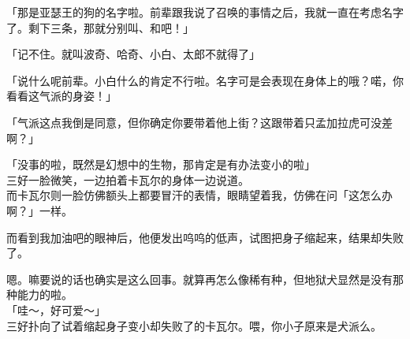 「那是亚瑟王的狗的名字啦。前辈跟我说了召唤的事情之后，我就一直在考虑名字了。剩下三条，那就分别叫、和吧！」

「记不住。就叫波奇、哈奇、小白、太郎不就得了」

「说什么呢前辈。小白什么的肯定不行啦。名字可是会表现在身体上的哦？喏，你看看这气派的身姿！」

「气派这点我倒是同意，但你确定你要带着他上街？这跟带着只孟加拉虎可没差啊？」

「没事的啦，既然是幻想中的生物，那肯定是有办法变小的啦」\\

三好一脸微笑，一边拍着卡瓦尔的身体一边说道。\\

而卡瓦尔则一脸仿佛额头上都要冒汗的表情，眼睛望着我，仿佛在问「这怎么办啊？」一样。

而看到我加油吧的眼神后，他便发出呜呜的低声，试图把身子缩起来，结果却失败了。

嗯。嘛要说的话也确实是这么回事。就算再怎么像稀有种，但地狱犬显然是没有那种能力的啦。\\

「哇～，好可爱～」\\

三好扑向了试着缩起身子变小却失败了的卡瓦尔。喂，你小子原来是犬派么。\\

